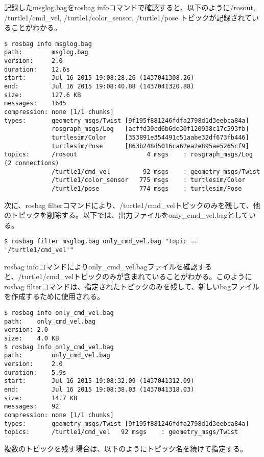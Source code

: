 記録したmsglog.bagをrosbag infoコマンドで確認すると、以下のように/rosout, /turtle1/cmd\_vel, /turtle1/color\_sensor, /turtle1/pose トピックが記録されていることがわかる。

\begin{lstlisting}[language=ROS]
$ rosbag info msglog.bag
path:        msglog.bag
version:     2.0
duration:    12.6s
start:       Jul 16 2015 19:08:28.26 (1437041308.26)
end:         Jul 16 2015 19:08:40.88 (1437041320.88)
size:        127.6 KB
messages:    1645
compression: none [1/1 chunks]
types:       geometry_msgs/Twist [9f195f881246fdfa2798d1d3eebca84a]
             rosgraph_msgs/Log   [acffd30cd6b6de30f120938c17c593fb]
             turtlesim/Color     [353891e354491c51aabe32df673fb446]
             turtlesim/Pose      [863b248d5016ca62ea2e895ae5265cf9]
topics:      /rosout                   4 msgs    : rosgraph_msgs/Log   (2 connections)
             /turtle1/cmd_vel         92 msgs    : geometry_msgs/Twist
             /turtle1/color_sensor   775 msgs    : turtlesim/Color
             /turtle1/pose           774 msgs    : turtlesim/Pose
\end{lstlisting}

次に、rosbag filterコマンドにより、/turtle1/cmd\_velトピックのみを残して、他のトピックを削除する。以下では、出力ファイルをonly\_cmd\_vel.bagとしている。

\begin{lstlisting}[language=ROS]
$ rosbag filter msglog.bag only_cmd_vel.bag "topic == '/turtle1/cmd_vel'"
\end{lstlisting}

rosbag infoコマンドによりonly\_cmd\_vel.bagファイルを確認すると、/turtle1/cmd\_velトピックのみが含まれていることがわかる。このようにrosbag filterコマンドは、指定されたトピックのみを残して、新しいbagファイルを作成するために使用される。

\begin{lstlisting}[language=ROS]
$ rosbag info only_cmd_vel.bag
path:    only_cmd_vel.bag
version: 2.0
size:    4.0 KB
$ rosbag info only_cmd_vel.bag
path:        only_cmd_vel.bag
version:     2.0
duration:    5.9s
start:       Jul 16 2015 19:08:32.09 (1437041312.09)
end:         Jul 16 2015 19:08:38.03 (1437041318.03)
size:        14.7 KB
messages:    92
compression: none [1/1 chunks]
types:       geometry_msgs/Twist [9f195f881246fdfa2798d1d3eebca84a]
topics:      /turtle1/cmd_vel   92 msgs    : geometry_msgs/Twist
\end{lstlisting}

複数のトピックを残す場合は、以下のようにトピック名を続けて指定する。

